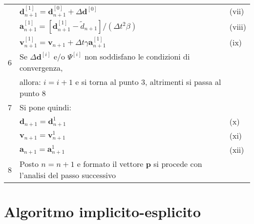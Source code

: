 \begin{table}
\begin{tabular}{lll}
	  & $\boldsymbol{d}_{n+1}^{[1]} = \boldsymbol{d}_{n+1}^{[0]} + \varDelta \boldsymbol{d}^{[0]}$                                                                                & (vii)  \\
	  & $\boldsymbol{a}_{n+1}^{[1]} = [\boldsymbol{d}_{n+1}^{[1]} - \tilde{d}_{n+1}] /(\varDelta t^2 \beta)$                                                                      & (viii) \\
	  & $\boldsymbol{v}_{n+1}^{[1]} = \boldsymbol{v}_{n+1} + \varDelta t \gamma \boldsymbol{a}_{n+1}^{[1]}$                                                                       & (ix)   \\
	6 & Se $\varDelta \boldsymbol{d}^{[i]}$ e/o $\boldsymbol{\varPsi}^{[i]} $ non soddisfano le condizioni di convergenza,                                                        &        \\   
	  & allora: $i= i+1$ e si torna al punto 3, altrimenti si passa al punto 8                                                                                                    &        \\ 
	7 & Si pone quindi:                                                                                                                                                           &        \\
	  & $\boldsymbol{d}_{n+1} = \boldsymbol{d}_{n+1}^{1}$                                                                                                                         & (x)    \\  
	  & $\boldsymbol{v}_{n+1} = \boldsymbol{v}_{n+1}^{1}$                                                                                                                         & (xi)   \\  
	  & $\boldsymbol{a}_{n+1} = \boldsymbol{a}_{n+1}^{1}$                                                                                                                         & (xii)  \\  
	8 & Posto $n=n+1$ e formato il vettore $\boldsymbol{p}$ si procede con l'analisi del passo successivo                                                                         &        \\
	\bottomrule    
\end{tabular}
\end{table}

\section{Algoritmo implicito-esplicito}

